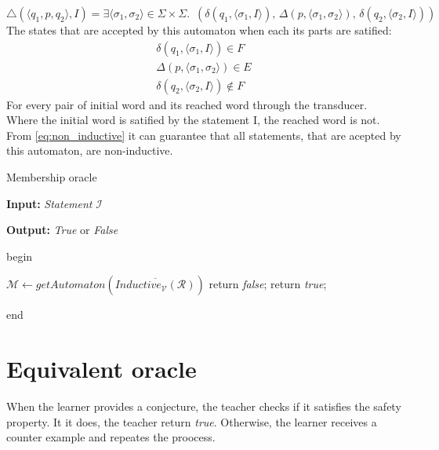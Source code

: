 \begin{equation*}
    \triangle(\langle q_1, p, q_2 \rangle, I) =  \exists \langle \sigma_1, \sigma_2 \rangle \in \Sigma \times \Sigma. \,\,\,
    (\delta(q_1, \langle \sigma_1, I \rangle) ,\, \Delta(p, \langle \sigma_1, \sigma_2 \rangle) ,\, \delta(q_2, \langle \sigma_2, I \rangle))
\end{equation*}
The states that are accepted by this automaton when each its parts are satified: 
\begin{align*} 
    \delta(q_1, \langle \sigma_1, I \rangle) \in  F \\
    \Delta(p, \langle \sigma_1, \sigma_2 \rangle) \in E \\
    \delta(q_2, \langle \sigma_2, I \rangle) \notin  F
\end{align*}
For every pair of initial word and its reached word through the transducer.
Where the initial word is satified by the statement I, the reached word is not.
From \ref{eq:non_inductive} it can guarantee that all statements, that are acepted by this automaton, are non-inductive.
\begin{algorithm}
\caption{Membership oracle}\label{alg:membership}
\textbf{Input: } \textit{Statement} $\mathcal{I}$ 

\textbf{Output: } \textit{True} or \textit{False}

begin
\begin{algorithmic}[1]
    \State $\mathcal{M} \gets getAutomaton(\overline{Inductive_{\mathcal{V}}(\mathcal{R})})$
        \State return \textit{false};
    \Else
        \State return \textit{true};
    \EndIf
\end{algorithmic}
end
\end{algorithm}
\section{Equivalent oracle}
When the learner provides a conjecture, the teacher checks if it satisfies
the safety property. It it does, the teacher return \textit{true}. Otherwise, the learner
receives a counter example and repeates the proocess.

